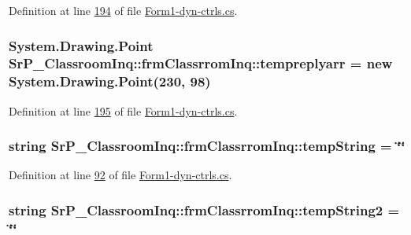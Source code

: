 \-Definition at line \hyperlink{_form1-dyn-ctrls_8cs_source_l00194}{194} of file \hyperlink{_form1-dyn-ctrls_8cs_source}{\-Form1-\/dyn-\/ctrls.\-cs}.

\hypertarget{class_sr_p___classroom_inq_1_1frm_classrrom_inq_ac6007ba00a6fab2fca4b74c0e588e850}{
\subsubsection[{tempreplyarr}]{\setlength{\rightskip}{0pt plus 5cm}\-System.\-Drawing.\-Point {\bf \-Sr\-P\-\_\-\-Classroom\-Inq\-::frm\-Classrrom\-Inq\-::tempreplyarr} = new \-System.\-Drawing.\-Point(230, 98)}}
\label{class_sr_p___classroom_inq_1_1frm_classrrom_inq_ac6007ba00a6fab2fca4b74c0e588e850}


\-Definition at line \hyperlink{_form1-dyn-ctrls_8cs_source_l00195}{195} of file \hyperlink{_form1-dyn-ctrls_8cs_source}{\-Form1-\/dyn-\/ctrls.\-cs}.

\hypertarget{class_sr_p___classroom_inq_1_1frm_classrrom_inq_aaad277eaea17731f132fb18aa3560a91}{
\subsubsection[{temp\-String}]{\setlength{\rightskip}{0pt plus 5cm}string {\bf \-Sr\-P\-\_\-\-Classroom\-Inq\-::frm\-Classrrom\-Inq\-::temp\-String} = \char`\"{}\char`\"{}}}
\label{class_sr_p___classroom_inq_1_1frm_classrrom_inq_aaad277eaea17731f132fb18aa3560a91}


\-Definition at line \hyperlink{_form1-dyn-ctrls_8cs_source_l00092}{92} of file \hyperlink{_form1-dyn-ctrls_8cs_source}{\-Form1-\/dyn-\/ctrls.\-cs}.

\hypertarget{class_sr_p___classroom_inq_1_1frm_classrrom_inq_a4ebaa0f6e4e9f61300c6aae855fc8fc1}{
\subsubsection[{temp\-String2}]{\setlength{\rightskip}{0pt plus 5cm}string {\bf \-Sr\-P\-\_\-\-Classroom\-Inq\-::frm\-Classrrom\-Inq\-::temp\-String2} = \char`\"{}\char`\"{}}}
\label{class_sr_p___classroom_inq_1_1frm_classrrom_inq_a4ebaa0f6e4e9f61300c6aae855fc8fc1}


